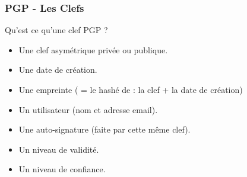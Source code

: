 \begin{frame}
    \frametitle{\color{white}PGP - Les Clefs}
    \begin{block}{Qu'est ce qu'une clef PGP ?}
    	\begin{itemize}
	  \item Une clef asymétrique privée ou publique.
	  \item Une date de création.
	  \item Une empreinte ( = le hashé de : la clef + la date de création)
	  \item Un utilisateur (nom et adresse email).
	  \item Une auto-signature (faite par cette même clef).
	  \item Un niveau de validité.
	  \item Un niveau de confiance.
       \end{itemize} 
    \end{block}
\end{frame}

